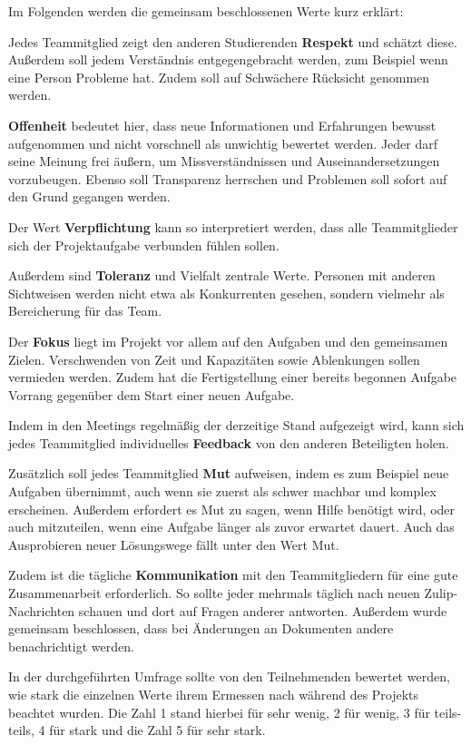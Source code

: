 \documentclass[../review_3.tex]{subfiles}
\begin{document}
Im Folgenden werden die gemeinsam beschlossenen Werte kurz erklärt:

Jedes Teammitglied zeigt den anderen Studierenden \textbf{Respekt} und schätzt diese. Außerdem soll jedem Verständnis entgegengebracht werden, zum Beispiel wenn eine Person Probleme hat. Zudem soll auf Schwächere Rücksicht genommen werden.

\textbf{Offenheit} bedeutet hier, dass neue Informationen und Erfahrungen bewusst aufgenommen und nicht vorschnell als unwichtig bewertet werden. Jeder darf seine Meinung frei äußern, um Missverständnissen und Auseinandersetzungen vorzubeugen. Ebenso soll Transparenz herrschen und Problemen soll sofort auf den Grund gegangen werden.

Der Wert \textbf{Verpflichtung} kann so interpretiert werden, dass alle Teammitglieder sich der Projektaufgabe verbunden fühlen sollen.

Außerdem sind \textbf{Toleranz} und Vielfalt zentrale Werte. Personen mit anderen Sichtweisen werden nicht etwa als Konkurrenten gesehen, sondern vielmehr als Bereicherung für das Team.

Der \textbf{Fokus} liegt im Projekt vor allem auf den Aufgaben und den gemeinsamen Zielen. Verschwenden von Zeit und Kapazitäten sowie Ablenkungen sollen vermieden werden. Zudem hat die Fertigstellung einer bereits begonnen Aufgabe Vorrang gegenüber dem Start einer neuen Aufgabe.

Indem in den Meetings regelmäßig der derzeitige Stand aufgezeigt wird, kann sich jedes Teammitglied individuelles \textbf{Feedback} von den anderen Beteiligten holen.

Zusätzlich soll jedes Teammitglied \textbf{Mut} aufweisen, indem es zum Beispiel neue Aufgaben übernimmt, auch wenn sie zuerst als schwer machbar und komplex erscheinen. Außerdem erfordert es Mut zu sagen, wenn Hilfe benötigt wird, oder auch mitzuteilen, wenn eine Aufgabe länger als zuvor erwartet dauert. Auch das Ausprobieren neuer Lösungswege fällt unter den Wert Mut.

Zudem ist die tägliche \textbf{Kommunikation} mit den Teammitgliedern für eine gute Zusammenarbeit erforderlich. So sollte jeder mehrmals täglich nach neuen Zulip-Nachrichten schauen und dort auf Fragen anderer antworten. Außerdem wurde gemeinsam beschlossen, dass bei Änderungen an Dokumenten andere benachrichtigt werden.

In der durchgeführten Umfrage sollte von den Teilnehmenden bewertet werden, wie stark die einzelnen Werte ihrem Ermessen nach während des Projekts beachtet wurden. Die Zahl 1 stand hierbei für \glqq sehr wenig\grqq{}, 2 für  \glqq wenig\grqq{}, 3 für  \glqq teils-teils\grqq{}, 4 für  \glqq stark\grqq{} und die Zahl 5 für  \glqq sehr stark\grqq{}.
\end{document}
